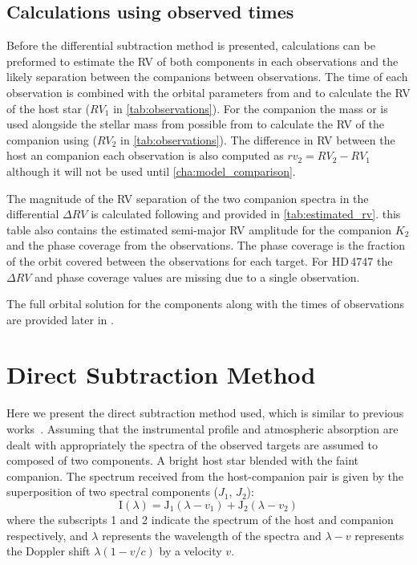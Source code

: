 \subsection{Calculations using observed times}
Before the differential subtraction method is presented, calculations can be preformed to estimate the RV of both components in each observations and the likely separation between the companions between observations.
The time of each observation is combined with the orbital parameters from  and \eref{} to calculate the RV of the host star (\({RV}_{1}\) in \ref{tab:observations}).
For the companion the mass or \mtwosini  is used alongside the stellar mass from  possible from  to calculate the RV of the companion  using  (\({RV}_{2}\) in \ref{tab:observations}).
The difference in RV between the host an companion each observation is also computed as \({rv}_{2} = {RV}_{2}-{RV}_{1}\) although it will not be used until \ref{cha:model_comparison}.

The magnitude of the RV separation of the two companion spectra in the differential \(\Delta RV\) is calculated following  and provided in \ref{tab:estimated_rv}. this table also contains the estimated semi-major RV amplitude for the companion \(K_2\) and the phase coverage from the observations. The phase coverage is the fraction of the orbit covered between the observations for each target. For {HD\,4747} the \(\Delta RV\) and phase coverage values are missing due to a single observation.



The full orbital solution for the components along with the times of observations are provided later in .


\section{Direct Subtraction Method}
\label{sec:direct-subtraction}
Here we present the direct subtraction method used, which is similar to previous works~\citep{ferluga_separating_1997,kostogryz_spectral_2013}. Assuming that the instrumental profile and atmospheric absorption are dealt with appropriately the spectra of the observed targets are assumed to composed of two components. A bright host star blended with the faint companion. The spectrum received from the host-companion pair is given by the superposition of two spectral components (\(J_{1}\), \(J_{2}\)):
\begin{equation}
\textrm{I}(\lambda) = \textrm{J}_{1}(\lambda - v_{1}) + \textrm{J}_{2}(\lambda - v_{2})
\end{equation}
where the subscripts 1 and 2 indicate the spectrum of the host and companion respectively, and \(\lambda\) represents the wavelength of the spectra and \(\lambda-v\) represents the Doppler shift \(\lambda(1-v/c)\) by a velocity \(v\).


